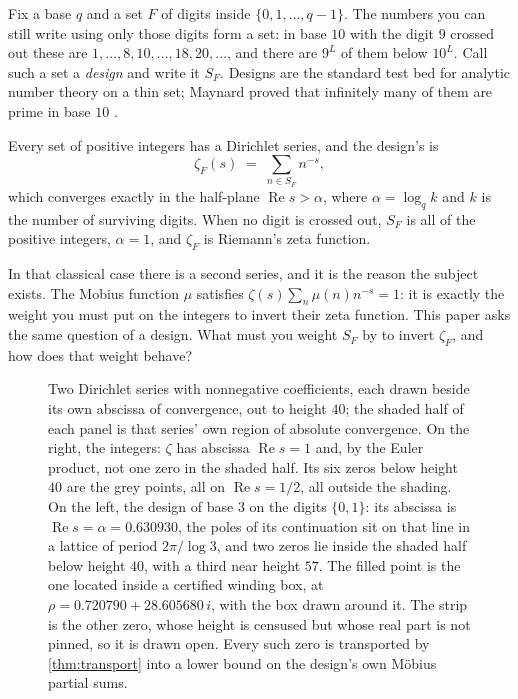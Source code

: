 \documentclass[11pt]{amsart}
\theoremstyle{definition}
\theoremstyle{remark}
\begin{document}
Fix a base $q$ and a set $F$ of digits inside $\{0,1,\dots,q-1\}$. The numbers you can still write using only those digits form a set: in base $10$ with the digit $9$ crossed out these are $1,\dots,8,10,\dots,18,20,\dots$, and there are $9^{L}$ of them below $10^{L}$. Call such a set a \emph{design} and write it $S_{F}$. Designs are the standard test bed for analytic number theory on a thin set; Maynard proved that infinitely many of them are prime in base $10$ \cite{may}.

Every set of positive integers has a Dirichlet series, and the design's is
\[
  \zeta_{F}(s) \;=\; \sum_{n \in S_{F}} n^{-s},
\]
which converges exactly in the half-plane $\operatorname{Re} s > \alpha$, where $\alpha = \log_{q} k$ and $k$ is the number of surviving digits. When no digit is crossed out, $S_{F}$ is all of the positive integers, $\alpha = 1$, and $\zeta_{F}$ is Riemann's zeta function.

In that classical case there is a second series, and it is the reason the subject exists. The Mobius function $\mu$ satisfies $\zeta(s) \sum_{n} \mu(n) n^{-s} = 1$: it is exactly the weight you must put on the integers to invert their zeta function. This paper asks the same question of a design. What must you weight $S_{F}$ by to invert $\zeta_{F}$, and how does that weight behave?

\begin{figure}[t]
\centering

\caption{Two Dirichlet series with nonnegative coefficients, each drawn beside its own abscissa of convergence, out to height $40$; the shaded half of each panel is that series' own region of absolute convergence. On the right, the integers: $\zeta$ has abscissa $\operatorname{Re} s = 1$ and, by the Euler product, not one zero in the shaded half. Its six zeros below height $40$ are the grey points, all on $\operatorname{Re} s = 1/2$, all outside the shading. On the left, the design of base $3$ on the digits $\{0,1\}$: its abscissa is $\operatorname{Re} s = \alpha = 0.630930$, the poles of its continuation sit on that line in a lattice of period $2\pi/\log 3$, and two zeros lie inside the shaded half below height $40$, with a third near height $57$. The filled point is the one located inside a certified winding box, at $\rho = 0.720790 + 28.605680\,i$, with the box drawn around it. The strip is the other zero, whose height is censused but whose real part is not pinned, so it is drawn open. Every such zero is transported by \cref{thm:transport} into a lower bound on the design's own M\"obius partial sums.}
\label{fig:zeros}
\end{figure}
\end{document}
